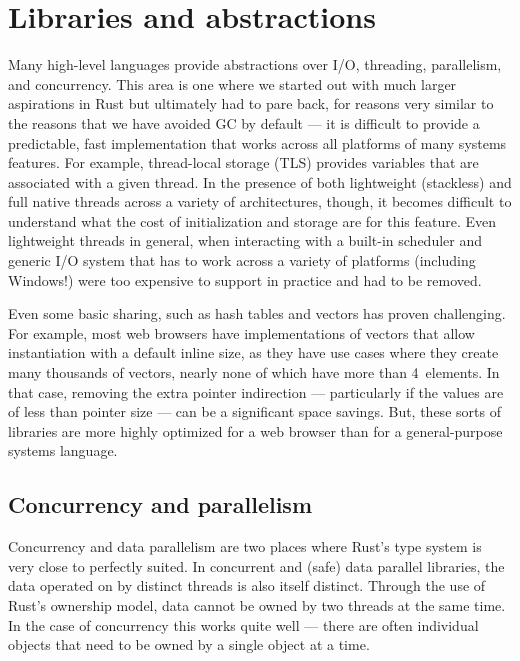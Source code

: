 
\section{Libraries and abstractions}
\label{sec:libraries}

Many high-level languages provide abstractions over I/O, threading, parallelism, and concurrency.
This area is one where we started out with much larger aspirations in Rust but ultimately had to pare back,
for reasons very similar to the reasons that we have avoided GC by default --- it is difficult to provide a
predictable, fast implementation that works across all platforms of many systems features.
For example, thread-local storage (TLS) provides variables that are associated with a given thread.
In the presence of both lightweight (stackless) and full native threads across a variety of architectures, though,
it becomes difficult to understand what the cost of initialization and storage are for this feature.
Even lightweight threads in general, when interacting with a built-in scheduler and generic I/O system that
has to work across a variety of platforms (including Windows!) were too expensive to support in practice and
had to be removed.

Even some basic sharing, such as hash tables and vectors has proven challenging.
For example, most web browsers have implementations of vectors that allow instantiation with a default inline size,
as they have use cases where they create many thousands of vectors, nearly none of which have more than 4~elements.
In that case, removing the extra pointer indirection --- particularly if the values are of less than pointer size ---
can be a significant space savings.
But, these sorts of libraries are more highly optimized for a web browser than for a general-purpose systems language.

\subsection{Concurrency and parallelism}

Concurrency and data parallelism are two places where Rust's type system is very close to perfectly suited.
In concurrent and (safe) data parallel libraries, the data operated on by distinct threads is also itself distinct.
Through the use of Rust's ownership model, data cannot be owned by two threads at the same time.
In the case of concurrency this works quite well --- there are often individual objects that need to be owned by
a single object at a time.

